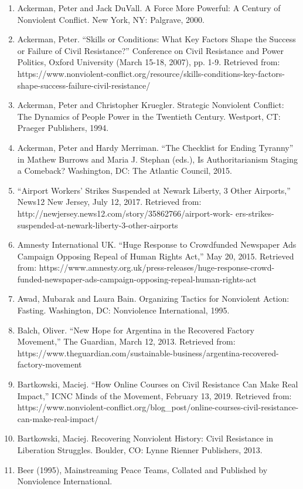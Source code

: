 \documentclass[twoside,a4paper,12pt,fleqn,openany]{extbook}
\begin{document}
\begin{enumerate}
\item Ackerman, Peter and Jack DuVall. A Force More Powerful: A Century of Nonviolent Conflict. New York, NY: Palgrave, 2000.
\item Ackerman, Peter. “Skills or Conditions: What Key Factors Shape the Success or Failure of
Civil Resistance?” Conference on Civil Resistance and Power Politics, Oxford University (March 15-18, 2007), pp. 1-9. Retrieved from: https://www.nonviolent-conflict.org/resource/skills-conditions-key-factors-shape-success-failure-civil-resistance/
\item Ackerman, Peter and Christopher Kruegler. Strategic Nonviolent Conflict: The Dynamics of
People Power in the Twentieth Century. Westport, CT: Praeger Publishers, 1994.
\item Ackerman, Peter and Hardy Merriman. “The Checklist for Ending Tyranny” in Mathew Burrows and Maria J. Stephan (eds.), Is Authoritarianism Staging a Comeback? Washington, DC: The Atlantic Council, 2015.
\item “Airport Workers’ Strikes Suspended at Newark Liberty, 3 Other Airports,” News12 New Jersey, July 12, 2017. Retrieved from: http://newjersey.news12.com/story/35862766/airport-work-
ers-strikes-suspended-at-newark-liberty-3-other-airports
\item Amnesty International UK. “Huge Response to Crowdfunded Newspaper Ads Campaign Opposing Repeal of Human Rights Act,” May 20, 2015. Retrieved from: https://www.amnesty.org.uk/press-releases/huge-response-crowd-funded-newspaper-ads-campaign-opposing-repeal-human-rights-act
\item Awad, Mubarak and Laura Bain. Organizing Tactics for Nonviolent Action: Fasting. Washington, DC: Nonviolence International, 1995.
\item Balch, Oliver. “New Hope for Argentina in the Recovered Factory Movement,” The Guardian, March 12, 2013. Retrieved from: https://www.theguardian.com/sustainable-business/argentina-recovered-factory-movement
\item Bartkowski, Maciej. “How Online Courses on Civil Resistance Can Make Real Impact,” ICNC Minds of the Movement, February 13, 2019. Retrieved from: https://www.nonviolent-conflict.org/blog_post/online-courses-civil-resistance-can-make-real-impact/
\item Bartkowski, Maciej. Recovering Nonviolent History: Civil Resistance in Liberation Struggles. Boulder, CO: Lynne Rienner Publishers, 2013.
\item Beer (1995), Mainstreaming Peace Teams, Collated and Published by Nonviolence International.

\end{enumerate}
\end{document}
